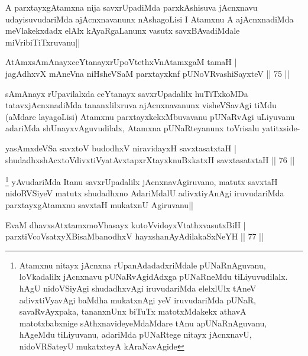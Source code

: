 \begin{artha}
A parxtayxgAtamxna nija savxrUpadiMda parxkAshisuva jAcnxnavu udayisuvudariMda ajAcnxnavanunx nAshagoLisi I Atamxnu A ajAcnxnadiMda meVlakekxdadx elAlx kAyaRgaLanunx vasutx savxBAvadiMdale miVribiTiTxruvanu||
\end{artha}


\begin{shl}
AtAmx\s sAmAnayxceYtanayxrUpoVtethxVnA\s \s tamxgaM tamaH |\\
jagAdhxvX mAneVna niHsheVSaM parxtayxknf pUNoVR\s vashiSayxteV \hfill || 75 ||
\end{shl}

\begin{artha}
sAmAnayx rUpavilalxda ceYtanayx savxrUpadalilx huTiTxkoMDa tatavxjAcnxnadiMda tananxlilxruva ajAcnxnavanunx visheVSavAgi tiMdu (aMdare layagoLisi) Atamxnu parxtayxkekxMbuvavanu pUNaRvAgi uLiyuvanu adariMda shUnayxvAguvudilalx, Atamxna pUNaRteyanunx toVrisalu yatitxside-
\end{artha}


\begin{shl}
yasAmxdeVSa savxtoV budodhxV niravidayxH savxtasatxtaH |\\
shudadhxshAcxtoV\s divxtiVyatAvxtapxrXtayxknuBxkatxH savxtasatxtaH \hfill || 76 ||
\end{shl}

\begin{artha}
\footnote[1]{Atamxnu nitayx jAcnxna rUpanAdadadxriMdale pUNaRnAguvanu, loVkadalilx jAcnxnavu pUNaRvAgidAdxga pUNaRneMdu tiLiyuvudilalx. hAgU nidoVSiyAgi shudadhxvAgi iruvudariMda elelxlUlx tAneV adivxtiVyavAgi baMdha mukatxnAgi yeV iruvudariMda pUNaR, savaRvAyxpaka, tananxnUnx biTuTx matotxMdakekx athavA matotxbabxnige sAthxnavideyeMdaMdare tAnu apUNaRnAguvanu, hAgeMdu tiLiyuvanu, adariMda pUNaRtege nitayx jAcnxnavU, nidoVRSateyU mukatxteyA kAraNavAgide} yAvudariMda Itanu savxrUpadalilx jAcnxnavAgiruvano, matutx savxtaH nidoRVSiyeV matutx shudadhxno AdariMdalU adivxtiyAnAgi iruvudariMda parxtayxgAtamxnu savxtaH mukatxnU Agiruvanu|| 
\end{artha}%

\begin{shl}
EvaM dhavxsAtxtamxmoVhasayx kutoV\s vidoyxVtathxvasutxBiH |\\
parxtiVcoV\s satxyXBisaMbanodhxV hayxshanAyAdilakaSxNeYH \hfill || 77 ||
\end{shl}

